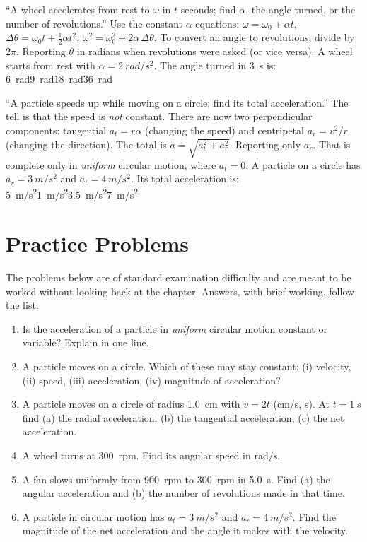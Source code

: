 {``A wheel accelerates from rest to $\omega$ in $t$ seconds; find $\alpha$, the angle turned, or the
number of revolutions.''}
{Use the constant-$\alpha$ equations: $\omega=\omega_0+\alpha t$, $\Delta\theta=\omega_0t+\tfrac12\alpha t^2$,
$\omega^2=\omega_0^2+2\alpha\,\Delta\theta$. To convert an angle to revolutions, divide by $2\pi$.}
{Reporting $\theta$ in radians when revolutions were asked (or vice versa).}
{A wheel starts from rest with $\alpha=\SI{2}{rad/s^2}$. The angle turned in \SI{3}{s} is:}
{\SI{6}{rad}}{\SI{9}{rad}}{\SI{18}{rad}}{\SI{36}{rad}}

{``A particle speeds up while moving on a circle; find its total acceleration.'' The tell is that the
speed is \emph{not} constant.}
{There are now two perpendicular components: tangential $a_t=r\alpha$ (changing the speed) and
centripetal $a_r=v^2/r$ (changing the direction). The total is
$a=\sqrt{a_t^2+a_r^2}$.}
{Reporting only $a_r$. That is complete only in \emph{uniform} circular motion, where $a_t=0$.}
{A particle on a circle has $a_r=\SI{3}{m/s^2}$ and $a_t=\SI{4}{m/s^2}$. Its total acceleration is:}
{\SI{5}{m/s^2}}{\SI{1}{m/s^2}}{\SI{3.5}{m/s^2}}{\SI{7}{m/s^2}}

\section{Practice Problems}\label{sec:practice6}

The problems below are of standard examination difficulty and are meant to be worked without looking back at the chapter. Answers, with brief working, follow the list.

\begin{enumerate}[itemsep=3pt]
\item Is the acceleration of a particle in \emph{uniform} circular motion constant or variable? Explain
      in one line.
\item A particle moves on a circle. Which of these may stay constant: (i) velocity,
      (ii) speed, (iii) acceleration, (iv) magnitude of acceleration?
\item A particle moves on a circle of radius \SI{1.0}{cm} with $v=2t$ (cm/s, s). At $t=\SI{1}{s}$ find
      (a) the radial acceleration, (b) the tangential acceleration, (c) the net acceleration.
\item A wheel turns at \SI{300}{rpm}. Find its angular speed in \si{rad/s}.
\item A fan slows uniformly from \SI{900}{rpm} to \SI{300}{rpm} in \SI{5.0}{s}. Find (a) the angular
      acceleration and (b) the number of revolutions made in that time.
\item A particle in circular motion has $a_t=\SI{3}{m/s^2}$ and $a_r=\SI{4}{m/s^2}$. Find the magnitude
      of the net acceleration and the angle it makes with the velocity.
\end{enumerate}

